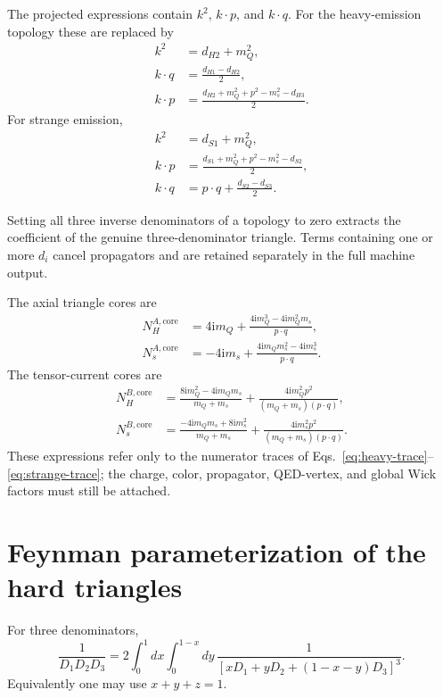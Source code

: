 \documentclass[11pt]{article}
\newcommand{\ii}{\mathrm{i}}
\begin{document}
The projected expressions contain $k^2$, $k\cdot p$, and $k\cdot q$.  For the
heavy-emission topology these are replaced by
\begin{align}
  k^2&=d_{H2}+m_Q^2,\\
  k\cdot q&=\frac{d_{H1}-d_{H2}}{2},\\
  k\cdot p&=\frac{d_{H2}+m_Q^2+p^2-m_s^2-d_{H3}}{2}.
\end{align}
For strange emission,
\begin{align}
  k^2&=d_{S1}+m_Q^2,\\
  k\cdot p&=\frac{d_{S1}+m_Q^2+p^2-m_s^2-d_{S2}}{2},\\
  k\cdot q&=p\cdot q+\frac{d_{S2}-d_{S3}}{2}.
\end{align}

Setting all three inverse denominators of a topology to zero extracts the
coefficient of the genuine three-denominator triangle.  Terms containing one
or more $d_i$ cancel propagators and are retained separately in the full
machine output.

The axial triangle cores are
\begin{align}
  N^{A,\mathrm{core}}_H
  &=4\ii m_Q+
    \frac{4\ii m_Q^3-4\ii m_Q^2m_s}{p\cdot q},\\
  N^{A,\mathrm{core}}_s
  &=-4\ii m_s+
    \frac{4\ii m_Qm_s^2-4\ii m_s^3}{p\cdot q}.
\end{align}
The tensor-current cores are
\begin{align}
  N^{B,\mathrm{core}}_H
  &=\frac{8\ii m_Q^2-4\ii m_Qm_s}{m_Q+m_s}
    +\frac{4\ii m_Q^2p^2}{(m_Q+m_s)(p\cdot q)},\\
  N^{B,\mathrm{core}}_s
  &=\frac{-4\ii m_Qm_s+8\ii m_s^2}{m_Q+m_s}
    +\frac{4\ii m_s^2p^2}{(m_Q+m_s)(p\cdot q)}.
\end{align}
These expressions refer only to the numerator traces of
Eqs.~\eqref{eq:heavy-trace}--\eqref{eq:strange-trace}; the charge, color,
propagator, QED-vertex, and global Wick factors must still be attached.

\section{Feynman parameterization of the hard triangles}

For three denominators,
\begin{equation}
  \frac{1}{D_1D_2D_3}
  =2\int_0^1dx\int_0^{1-x}dy\,
  \frac{1}{[xD_1+yD_2+(1-x-y)D_3]^3}.
  \label{eq:feynman-identity}
\end{equation}
Equivalently one may use $x+y+z=1$.
\end{document}
